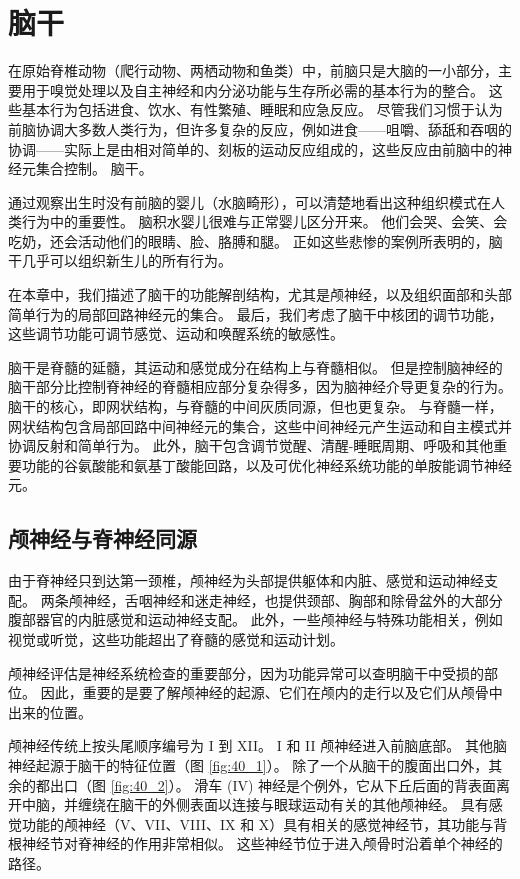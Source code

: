 \chapter{脑干} \label{chap:chap40}
在原始脊椎动物（爬行动物、两栖动物和鱼类）中，前脑只是大脑的一小部分，主要用于嗅觉处理以及自主神经和内分泌功能与生存所必需的基本行为的整合。 这些基本行为包括进食、饮水、有性繁殖、睡眠和应急反应。 尽管我们习惯于认为前脑协调大多数人类行为，但许多复杂的反应，例如进食——咀嚼、舔舐和吞咽的协调——实际上是由相对简单的、刻板的运动反应组成的，这些反应由前脑中的神经元集合控制。 脑干。

通过观察出生时没有前脑的婴儿（水脑畸形），可以清楚地看出这种组织模式在人类行为中的重要性。 脑积水婴儿很难与正常婴儿区分开来。 他们会哭、会笑、会吃奶，还会活动他们的眼睛、脸、胳膊和腿。 正如这些悲惨的案例所表明的，脑干几乎可以组织新生儿的所有行为。

在本章中，我们描述了脑干的功能解剖结构，尤其是颅神经，以及组织面部和头部简单行为的局部回路神经元的集合。 最后，我们考虑了脑干中核团的调节功能，这些调节功能可调节感觉、运动和唤醒系统的敏感性。

脑干是脊髓的延髓，其运动和感觉成分在结构上与脊髓相似。 但是控制脑神经的脑干部分比控制脊神经的脊髓相应部分复杂得多，因为脑神经介导更复杂的行为。 脑干的核心，即网状结构，与脊髓的中间灰质同源，但也更复杂。 与脊髓一样，网状结构包含局部回路中间神经元的集合，这些中间神经元产生运动和自主模式并协调反射和简单行为。 此外，脑干包含调节觉醒、清醒-睡眠周期、呼吸和其他重要功能的谷氨酸能和氨基丁酸能回路，以及可优化神经系统功能的单胺能调节神经元。

\section{颅神经与脊神经同源}
由于脊神经只到达第一颈椎，颅神经为头部提供躯体和内脏、感觉和运动神经支配。 两条颅神经，舌咽神经和迷走神经，也提供颈部、胸部和除骨盆外的大部分腹部器官的内脏感觉和运动神经支配。 此外，一些颅神经与特殊功能相关，例如视觉或听觉，这些功能超出了脊髓的感觉和运动计划。

颅神经评估是神经系统检查的重要部分，因为功能异常可以查明脑干中受损的部位。 因此，重要的是要了解颅神经的起源、它们在颅内的走行以及它们从颅骨中出来的位置。

颅神经传统上按头尾顺序编号为 I 到 XII。 I 和 II 颅神经进入前脑底部。 
其他脑神经起源于脑干的特征位置（图 \ref{fig:40_1}）。 
除了一个从脑干的腹面出口外，其余的都出口（图 \ref{fig:40_2}）。 
滑车 (IV) 神经是个例外，它从下丘后面的背表面离开中脑，并缠绕在脑干的外侧表面以连接与眼球运动有关的其他颅神经。 
具有感觉功能的颅神经（V、VII、VIII、IX 和 X）具有相关的感觉神经节，其功能与背根神经节对脊神经的作用非常相似。 这些神经节位于进入颅骨时沿着单个神经的路径。


